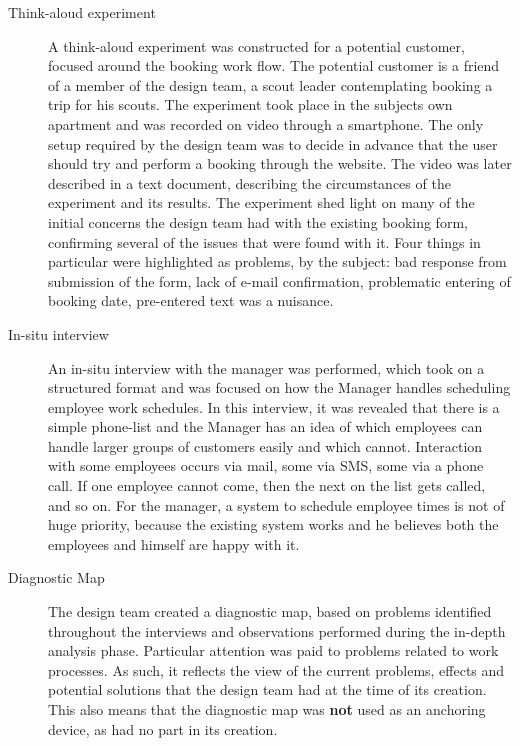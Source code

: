 \begin{description}
    \item [Think-aloud experiment] A think-aloud experiment was constructed for
        a potential customer, focused around the booking work flow. The
        potential customer is a friend of a member of the design team, a scout
        leader contemplating booking a trip for his scouts. The
        experiment took place in the subjects own apartment and was recorded on
        video through a smartphone. The only setup required by the design team
        was to decide in advance that the user should try and perform a booking
        through the \gomonkey{} website. The video was later described in a text
        document, describing the circumstances of the experiment and its
        results. The experiment shed light on many of the initial concerns the
        design team had with the existing booking form, confirming several of
        the issues that were found with it. Four things in particular were
        highlighted as problems, by the subject: bad response from submission of the form,
        lack of e-mail confirmation, problematic entering of booking date,
        pre-entered text was a nuisance.

    \item [In-situ interview] An in-situ interview with the manager was
        performed, which took on a structured format and was focused on how the
        Manager handles scheduling employee work schedules. In this interview,
        it was revealed that there is a simple phone-list and the Manager has an
        idea of which employees can handle larger groups of customers easily and
        which cannot. Interaction with some employees occurs via mail, some via
        SMS, some via a phone call. If one employee cannot come, then the next
        on the list gets called, and so on. For the manager, a system to
        schedule employee times is not of huge priority, because the existing
        system works and he believes both the employees and himself are happy
        with it.
    \item [Diagnostic Map] The design team created a diagnostic map, based on
        problems identified throughout the interviews and observations performed 
        during the in-depth analysis phase. Particular attention was paid to
        problems related to work processes. As such, it reflects the view of the
        current problems, effects and potential solutions that the design team
        had at the time of its creation. This also means that the diagnostic map
        was \textbf{not} used as an anchoring device\cite{bodker2004participatory}, 
        as \gomonkey{} had no part in its creation. 
\end{description}


